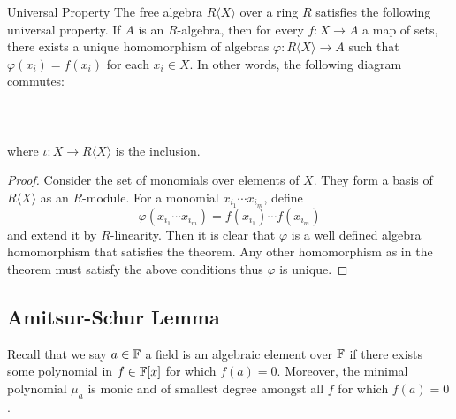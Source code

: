 \documentclass[a4paper]{article}
\begin{document}
\begin{prp}{Universal Property}{} The free algebra $R\langle X\rangle$ over a ring $R$ satisfies the following universal property. If $A$ is an $R$-algebra, then for every $f:X\to A$ a map of sets, there exists a unique homomorphism of algebras $\varphi:R\langle X\rangle\to A$ such that $\varphi(x_i)=f(x_i)$ for each $x_i\in X$. In other words, the following diagram commutes: \\~\\
\\~\\
where $\iota:X\to R\langle X\rangle$ is the inclusion. \tcbline
\begin{proof}
Consider the set of monomials over elements of $X$. They form a basis of $R\langle X\rangle$ as an $R$-module. For a monomial $x_{i_1}\cdots x_{i_m}$, define $$\varphi(x_{i_1}\cdots x_{i_m})=f(x_{i_1})\cdots f(x_{i_m})$$ and extend it by $R$-linearity. Then it is clear that $\varphi$ is a well defined algebra homomorphism that satisfies the theorem. Any other homomorphism as in the theorem must satisfy the above conditions thus $\varphi$ is unique. 
\end{proof}
\end{prp}

\subsection{Amitsur-Schur Lemma}
Recall that we say $a\in\mathbb{F}$ a field is an algebraic element over $\mathbb{F}$ if there exists some polynomial in $f\in\mathbb{F}[x]$ for which $f(a)=0$. Moreover, the minimal polynomial $\mu_a$ is monic and of smallest degree amongst all $f$ for which $f(a)=0$. 
\end{document}
